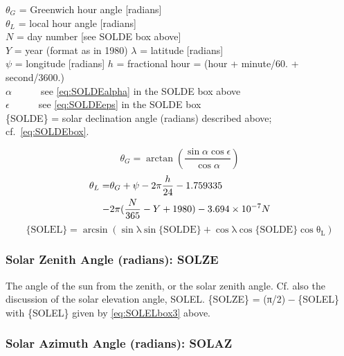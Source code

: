 \documentclass[
]{book}
\begin{document}
\(\theta_{G}\) = Greenwich hour angle
{[}radians{]}\\
\(\theta_{L}\) = local hour angle
{[}radians{]}\\
\(N\) = day number {[}see SOLDE box above{]}\\
\(Y\) = year (format as in 1980)
\(\lambda\) = latitude {[}radians{]}\\
\(\psi\) = longitude {[}radians{]}
\(h\) = fractional hour = (hour + minute/60. + second/3600.)\\
\(\alpha\)~~~~~~see \eqref{eq:SOLDEalpha} in the SOLDE box above\\
\(\epsilon\)~~~~~~see \eqref{eq:SOLDEeps} in the SOLDE box\\
\{SOLDE\} = solar declination angle (radians) described above; cf.~\eqref{eq:SOLDEbox}.

\begin{equation}
\theta_{G}=\arctan(\frac{\sin\alpha\cos\epsilon}{\cos\alpha})
\label{eq:SOLELbox1}
\end{equation}
\begin{align}
\theta_{L} = & \theta_{G}+\psi-2\pi\frac{h}{24}-1.759335\notag \\
 - &2\pi(\frac{N}{365}-Y+1980)-3.694\times10^{-7}N
\label{eq:SOLELbox2}
\end{align}
\begin{equation}
\mathrm{\mathrm{\{SOLEL\}}=\arcsin\left(\sin\lambda\sin\mathrm{\{SOLDE\}+\cos\lambda}\cos\mathrm{\{SOLDE\}}\cos\theta_{L}\right)}
\label{eq:SOLELbox3}
\end{equation}

\hypertarget{solze}{%
\subsubsection*{Solar Zenith Angle (radians): SOLZE}\label{solze}}

The angle of the sun from the zenith, or the solar zenith angle. Cf. also the discussion of the solar elevation angle, SOLEL. {\{SOLZE\} = (π/2) − \{SOLEL\}} with \{SOLEL\} given by \eqref{eq:SOLELbox3} above.

\hypertarget{solaz}{%
\subsubsection*{Solar Azimuth Angle (radians): SOLAZ}\label{solaz}}
\end{document}
